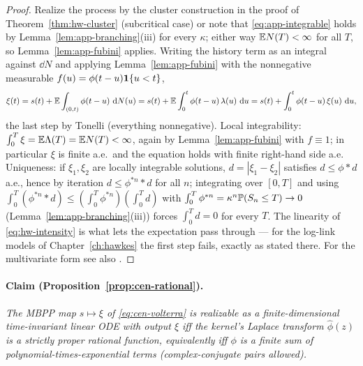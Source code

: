 \begin{proof}
Realize the process by the cluster construction in the proof of Theorem~\ref{thm:hw-cluster}
(subcritical case) or note that \eqref{eq:app-integrable} holds by
Lemma~\ref{lem:app-branching}(iii) for every $\kappa$; either way $\mathbb{E} N(T) < \infty$ for all $T$, so
Lemma~\ref{lem:app-fubini} applies. Writing the history term as an integral against $\dd N$ and
applying Lemma~\ref{lem:app-fubini} with the nonnegative measurable $f(u) = \phi(t-u)\mathbf{1}\{u < t\}$,
\[
\xi(t) = s(t) + \mathbb{E} \int_{(0,t)} \phi(t-u)\, \,\mathrm{d} N(u)
= s(t) + \mathbb{E} \int_0^t \phi(t-u)\, \lambda(u)\, \,\mathrm{d} u
= s(t) + \int_0^t \phi(t-u)\, \xi(u)\, \,\mathrm{d} u ,
\]
the last step by Tonelli (everything nonnegative). Local integrability: $\int_0^T \xi = \mathbb{E}
\Lambda(T) = \mathbb{E} N(T) < \infty$, again by Lemma~\ref{lem:app-fubini} with $f \equiv 1$; in particular
$\xi$ is finite a.e.\ and the equation holds with finite right-hand side a.e. Uniqueness: if $\xi_1,
\xi_2$ are locally integrable solutions, $d = |\xi_1 - \xi_2|$ satisfies $d \le \phi * d$ a.e.,
hence by iteration $d \le \phi^{*n} * d$ for all $n$; integrating over $[0,T]$ and using $\int_0^T
(\phi^{*n} * d) \le (\int_0^T \phi^{*n})(\int_0^T d)$ with $\int_0^T \phi^{*n} = \kappa^n \mathbb{P}(S_n
\le T) \to 0$ (Lemma~\ref{lem:app-branching}(iii)) forces $\int_0^T d = 0$ for every $T$. The
linearity of \eqref{eq:hw-intensity} is what lets the expectation pass through --- for the log-link
models of Chapter~\ref{ch:hawkes} the first step fails, exactly as stated there. For the
multivariate form see also \cite{bacry2015}.
\end{proof}

\paragraph{Claim (Proposition~\ref{prop:cen-rational}).}
\emph{The MBPP map $s \mapsto \xi$ of \eqref{eq:cen-volterra} is realizable as a finite-dimensional
time-invariant linear ODE with output $\xi$ iff the kernel's Laplace transform $\hat\phi(z)$ is a
strictly proper rational function, equivalently iff $\phi$ is a finite sum of
polynomial-times-exponential terms (complex-conjugate pairs allowed).}

